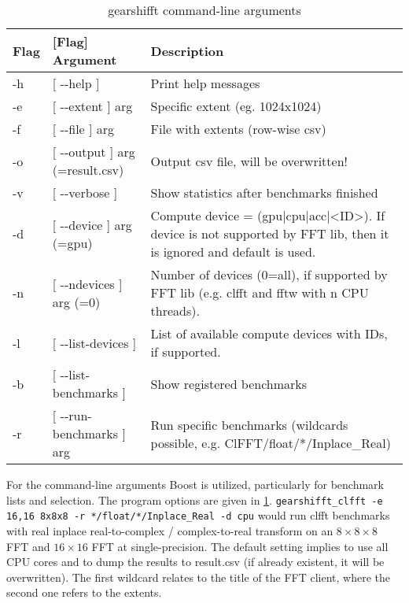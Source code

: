 
\begin{table}[htp]
 \centering
 \caption{gearshifft command-line arguments}
 \label{tab:cmdargs}
  \begin{tabular}{llp{6.4cm}}
\toprule
Flag & [Flag] Argument & Description \\
\midrule
-h&[ -{}-help ]                    &Print help messages \\
-e&[ -{}-extent ] arg              &Specific extent (eg. 1024x1024) \\
-f&[ -{}-file ] arg                &File with extents (row-wise csv) \\
-o&[ -{}-output ] arg (=result.csv)&Output csv file, will be overwritten! \\
-v&[ -{}-verbose ]                 &Show statistics after benchmarks finished \\
-d&[ -{}-device ] arg (=gpu)       &Compute device = (gpu|cpu|acc|<ID>). If 
                                  device is not supported by FFT lib, then it
                                  is ignored and default is used. \\
-n&[ -{}-ndevices ] arg (=0)       &Number of devices (0=all), if supported by 
                                  FFT lib (e.g. clfft and fftw with n CPU 
                                  threads). \\
-l&[ -{}-list-devices ]            &List of available compute devices with IDs,
                                  if supported.  \\
-b&[ -{}-list-benchmarks ]         &Show registered benchmarks \\
-r&[ -{}-run-benchmarks ] arg      &Run specific benchmarks (wildcards 
                                  possible, e.g. ClFFT/float/*/Inplace\_Real)\\
\bottomrule
  \end{tabular}
\end{table}

For the command-line arguments Boost is utilized, particularly for benchmark lists and selection. The \gearshifft{} program options are given in \cref{tab:cmdargs}.\linebreak
\verb!gearshifft_clfft -e 16,16 8x8x8 -r */float/*/Inplace_Real -d cpu!\linebreak
would run clfft benchmarks with real inplace real-to-complex / complex-to-real transform on an $8\times8\times8$ FFT and $16\times16$ FFT at single-precision. The default setting implies to use all CPU cores and to dump the results to result.csv (if already existent, it will be overwritten).
The first wildcard \mc{*} relates to the title of the FFT client, where the second one refers to the extents.

